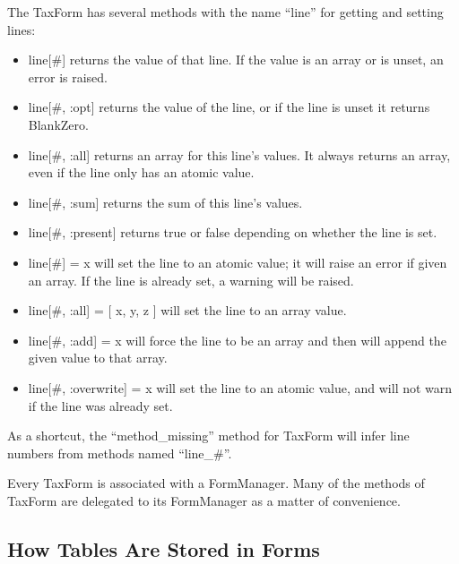 \documentclass[12pt]{article}
\begin{document}
The TaxForm has several methods with the name ``line'' for getting and setting
lines:
\begin{itemize}
\item line[\#] returns the value of that line. If the value is an array or is
unset, an error is raised.
\item line[\#, :opt] returns the value of the line, or if the line is
unset it returns BlankZero.
\item line[\#, :all] returns an array for this line's values. It always returns
an array, even if the line only has an atomic value.
\item line[\#, :sum] returns the sum of this line's values.
\item line[\#, :present] returns true or false depending on whether the line is
set.
\item line[\#] = x will set the line to an atomic value; it will raise an error
if given an array. If the line is already set, a warning will be raised.
\item line[\#, :all] = [ x, y, z ] will set the line to an array value.
\item line[\#, :add] = x will force the line to be an array and then will append
the given value to that array.
\item line[\#, :overwrite] = x will set the line to an atomic value, and will
not warn if the line was already set.
\end{itemize}
As a shortcut, the ``method\_missing'' method for TaxForm will infer line
numbers from methods named ``line\_\#''.

Every TaxForm is associated with a FormManager. Many of the methods of TaxForm
are delegated to its FormManager as a matter of convenience.

\subsection{How Tables Are Stored in Forms}
\end{document}
